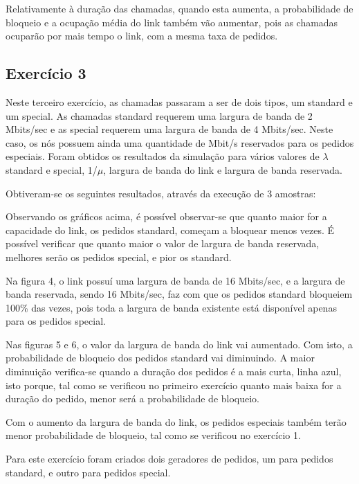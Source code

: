 \documentclass[pdftex,12pt,a4paper]{report}
\begin{document}
Relativamente à duração das chamadas, quando esta aumenta, a probabilidade de bloqueio e a ocupação média do link também vão aumentar, pois as chamadas ocuparão por mais tempo o link, com a mesma taxa de pedidos.

\newpage
\subsection{Exercício 3}

Neste terceiro exercício, as chamadas passaram a ser de dois tipos, um standard e um special. As chamadas standard requerem uma largura de banda de 2 Mbits/sec e as special requerem uma largura de banda de 4 Mbits/sec. Neste caso, os nós possuem ainda uma quantidade de Mbit/s reservados para os pedidos especiais. Foram obtidos os resultados da simulação para vários valores de $\lambda$ standard e special, 1/$\mu$, largura de banda do link e largura de banda reservada.

Obtiveram-se os seguintes resultados, através da execução de 3 amostras:

Observando os gráficos acima, é possível observar-se que quanto maior for a capacidade do link, os pedidos standard, começam a bloquear menos vezes. É possível verificar que quanto maior o valor de largura de banda reservada, melhores serão os pedidos special, e pior os standard. 

Na figura 4, o link possuí uma largura de banda de 16 Mbits/sec, e a largura de banda reservada, sendo 16 Mbits/sec, faz com que os pedidos standard bloqueiem 100\% das vezes, pois toda a largura de banda existente está disponível apenas para os pedidos special.

Nas figuras 5 e 6, o valor da largura de banda do link vai aumentado. Com isto, a probabilidade de bloqueio dos pedidos standard vai diminuindo. A maior diminuição verifica-se quando a duração dos pedidos é a mais curta, linha azul, isto porque, tal como se verificou no primeiro exercício quanto mais baixa for a duração do pedido, menor será a probabilidade de bloqueio.

Com o aumento da largura de banda do link, os pedidos especiais também terão menor probabilidade de bloqueio, tal como se verificou no exercício 1.

Para este exercício foram criados dois geradores de pedidos, um para pedidos standard, e outro para pedidos special.

\newpage
\end{document}
